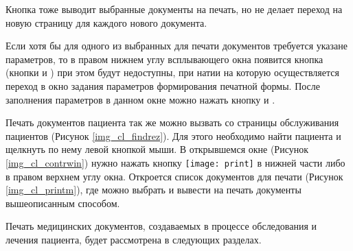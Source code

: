 {Кнопка  тоже выводит выбранные документы на печать, но не делает переход на новую страницу для каждого нового документа.

Если хотя бы для одного из выбранных для печати документов требуется указане параметров, то в правом нижнем углу всплывающего окна появится кнопка  (кнопки  и ) при этом будут недоступны, при натии на которую осуществляется переход в окно задания параметров формирования печатной формы. После заполнения параметров в данном окне можно нажать кнопку  и .

Печать документов пациента так же можно вызвать со страницы обслуживания пациентов (Рисунок \ref{img_cl_findrez}). Для этого необходимо найти пациента и щелкнуть по нему левой кнопкой мыши. В открывшемся окне (Рисунок \ref{img_cl_contrwin}) нужно нажать кнопку \texttt{[image: print]} в нижней части либо в правом верхнем углу окна. Откроется список документов для печати (Рисунок \ref{img_cl_printm}), где можно выбрать и вывести на печать документы вышеописанным способом. 
   
Печать медицинских документов, создаваемых в процессе обследования и лечения пациента, будет рассмотрена в следующих разделах.
}{}
